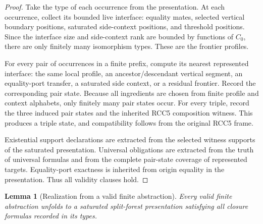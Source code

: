 \documentclass[11pt]{article}
\newtheorem{lemma}[theorem]{Lemma}
\begin{document}
\begin{proof}
Take the type of each occurrence from the presentation.  At each occurrence, collect its bounded live interface: equality mates, selected vertical boundary positions, saturated side-context positions, and threshold positions.  Since the interface size and side-context rank are bounded by functions of $C_0$, there are only finitely many isomorphism types.  These are the frontier profiles.

For every pair of occurrences in a finite prefix, compute its nearest represented interface: the same local profile, an ancestor/descendant vertical segment, an equality-port transfer, a saturated side context, or a residual frontier.  Record the corresponding pair state.  Because all ingredients are chosen from finite profile and context alphabets, only finitely many pair states occur.  For every triple, record the three induced pair states and the inherited RCC5 composition witness.  This produces a triple state, and compatibility follows from the original RCC5 frame.

Existential support declarations are extracted from the selected witness supports of the saturated presentation.  Universal obligations are extracted from the truth of universal formulas and from the complete pair-state coverage of represented targets.  Equality-port exactness is inherited from origin equality in the presentation.  Thus all validity clauses hold.
\end{proof}

\begin{lemma}[Realization from a valid finite abstraction]
Every valid finite abstraction unfolds to a saturated split-forest presentation satisfying all closure formulas recorded in its types.
\end{lemma}
\end{document}
